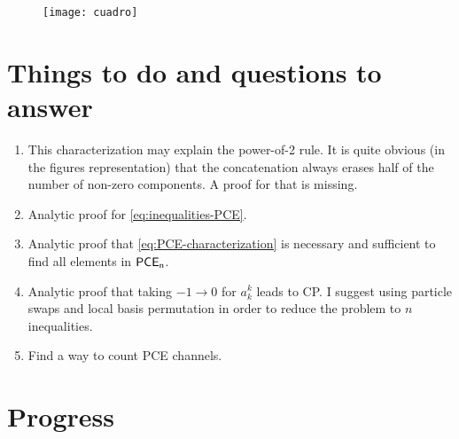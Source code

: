 \begin{figure}[H]
  \centering
  \texttt{[image: cuadro]}
\end{figure}
\section{Things to do and questions to answer} %
\begin{enumerate}
\item This characterization may explain the power-of-2 rule. 
It is quite obvious (in the figures representation) that the concatenation
always erases half of the number of non-zero components. A proof 
for that is missing.
\item Analytic proof for \eqref{eq:inequalities-PCE}. 
\item Analytic proof that \eqref{eq:PCE-characterization} is necessary 
and sufficient to find all elements in $\mathsf{PCE}_\mathsf{n}$.
\item Analytic proof that taking $-1\to 0$ for $a_k^k$ leads to CP.
I suggest using particle swaps and local basis permutation in order 
to reduce the problem to $n$ inequalities.
\item Find a way to count PCE channels.
\end{enumerate}

\section{Progress}
